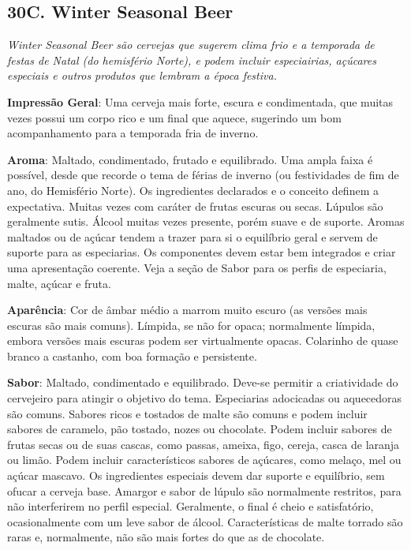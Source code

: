 \subsection*{30C. Winter Seasonal Beer}
\textit{Winter Seasonal Beer são cervejas que sugerem clima frio e a temporada de festas de Natal (do hemisfério Norte), e podem incluir especiairias, açúcares especiais e outros produtos que lembram a época festiva.}

\textbf{Impressão Geral}: Uma cerveja mais forte, escura e condimentada, que muitas vezes possui um corpo rico e um final que aquece, sugerindo um bom acompanhamento para a temporada fria de inverno.

\textbf{Aroma}: Maltado, condimentado, frutado e equilibrado. Uma ampla faixa é possível, desde que recorde o tema de férias de inverno (ou festividades de fim de ano, do Hemisfério Norte). Os ingredientes declarados e o conceito definem a expectativa. Muitas vezes com caráter de frutas escuras ou secas. Lúpulos são geralmente sutis. Álcool muitas vezes presente, porém suave e de suporte. Aromas maltados ou de açúcar tendem a trazer para si o equilíbrio geral e servem de suporte para as especiarias. Os componentes devem estar bem integrados e criar uma apresentação coerente. Veja a seção de Sabor para os perfis de especiaria, malte, açúcar e fruta.

\textbf{Aparência}: Cor de âmbar médio a marrom muito escuro (as versões mais escuras são mais comuns). Límpida, se não for opaca; normalmente límpida, embora versões mais escuras podem ser virtualmente opacas. Colarinho de quase branco a castanho, com boa formação e persistente.

\textbf{Sabor}: Maltado, condimentado e equilibrado. Deve-se permitir a criatividade do cervejeiro para atingir o objetivo do tema. Especiarias adocicadas ou aquecedoras são comuns. Sabores ricos e tostados de malte são comuns e podem incluir sabores de caramelo, pão tostado, nozes ou chocolate. Podem incluir sabores de frutas secas ou de suas cascas, como passas, ameixa, figo, cereja, casca de laranja ou limão. Podem incluir característicos sabores de açúcares, como melaço, mel ou açúcar mascavo. Os ingredientes especiais devem dar suporte e equilíbrio, sem ofucar a cerveja base. Amargor e sabor de lúpulo são normalmente restritos, para não interferirem no perfil especial. Geralmente, o final é cheio e satisfatório, ocasionalmente com um leve sabor de álcool. Características de malte torrado são raras e, normalmente, não são mais fortes do que as de chocolate.


